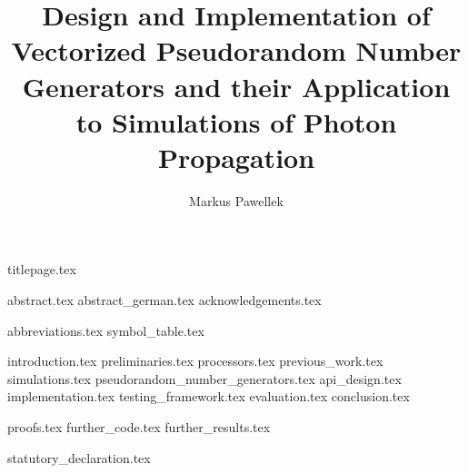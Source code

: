 \documentclass[fleqn,10pt,twoside]{stdglobal}
\title{Design and Implementation of Vectorized Pseudorandom Number Generators and their Application to Simulations of Photon Propagation}
\author{Markus Pawellek}
\let\oldpagenumbering\pagenumbering
\renewcommand*\pagenumbering[1]{\cleardoublepage\oldpagenumbering{#1}}
\begin{document}

  {titlepage.tex}

  {abstract.tex}
  \cleardoublepage
  {abstract_german.tex}
  {acknowledgements.tex}

  \tableofcontents
  \listoffigures
  \listoftables
  \listofmath
  {
    \small
    \listofcode
  }
  {abbreviations.tex}
  {symbol_table.tex}

  {introduction.tex}
  {preliminaries.tex}
  {processors.tex}
  {previous_work.tex}
  {simulations.tex}
  {pseudorandom_number_generators.tex}
  {api_design.tex}
  {implementation.tex}
  {testing_framework.tex}
  {evaluation.tex}
  {conclusion.tex}
  \printbibliography[heading=bibintoc]

  \appendix
  {proofs.tex}
  {further_code.tex}
  {further_results.tex}

  {statutory_declaration.tex}
\end{document}
